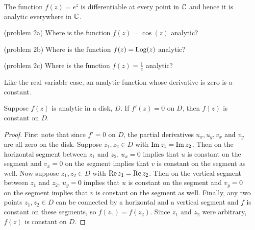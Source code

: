 \documentclass[handout]{ximera}
\begin{document}
\begin{example}[example 2]
The function $f(z) = e^z$ is differentiable at every point in $\mathbb C$ and hence 
it is analytic everywhere in $\mathbb C$.
\end{example}

\begin{problem}(problem 2a)
Where is the function $f(z) = \cos(z)$ analytic?\\
\begin{multipleChoice}
\end{multipleChoice}
\end{problem}

\begin{problem}(problem 2b)
Where is the function $f(z) = \operatorname{Log}(z)$ analytic?\\
\begin{multipleChoice}
\end{multipleChoice}
\end{problem}

\begin{problem}(problem 2c)
Where is the function $f(z) = \frac{1}{z}$ analytic?\\
\begin{multipleChoice}
\end{multipleChoice}
\end{problem}

Like the real variable case, an analytic function whose derivative is zero is a constant.

\begin{theorem}
Suppose $f(z)$ is analytic in a disk, $D$. If $f'(z) =0$ on $D$,
then $f(z)$ is constant on $D$.
\end{theorem}
\begin{proof}
First note that since $f'=0$ on $D$, the partial derivatives $u_x, u_y, v_x$ and $v_y$ 
are all zero on the disk.
Suppose $z_1, z_2 \in D$ with $\operatorname{Im} z_1 = \operatorname{Im} z_2$. Then on the horizontal segment 
between $z_1$ and $z_2$, $u_x = 0$ implies that $u$ is constant 
on the segment and $v_x =0$ on the segment implies that $v$ is constant on the segment as well.
Now suppose $z_1, z_2 \in D$ with $\operatorname{Re} z_1 = \operatorname{Re} z_2$. Then on the vertical segment 
between $z_1$ and $z_2$, $u_y = 0$ implies that $u$ is constant 
on the segment and $v_y =0$ on the segment implies that $v$ is constant on the segment as well.
Finally, any two points $z_1, z_2 \in D$ can be connected by a horizontal and a 
vertical segment and $f$ is constant on these segments, so $f(z_1) = f(z_2)$.
Since $z_1$ and $z_2$ were arbitrary, $f(z)$ is constant on $D$. 
\end{proof}
\end{document}
